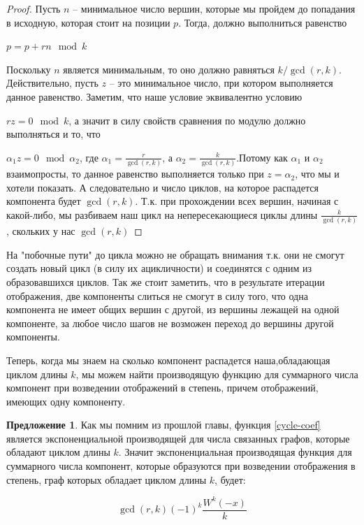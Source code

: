 \documentclass[10pt, a4paper]{report}
\theoremstyle{definition}
\newtheorem{remark}{Предложение}[chapter]
\begin{document}
\begin{proof}
	
	Пусть $n$ -- минимальное число вершин, которые мы пройдем до попадания в исходную, которая стоит на позиции $p$. Тогда, должно выполниться равенство
	
	$p=p+r n\mod k$
	
	Поскольку $n$ является минимальным, то оно должно равняться $k/\gcd(r,k)$. Действительно, пусть $z$ -- это минимальное число, при котором выполняется данное равенство. Заметим, что наше условие эквивалентно условию
	
	$r z = 0\mod k$, а значит в силу свойств сравнения по модулю должно выполняться и то, что 
	
	$\alpha_1 z = 0 \mod \alpha_2$, где $\alpha_1= \frac r {\gcd(r,k)}$, а $\alpha_2= \frac k {\gcd(r,k)}$.Потому как $\alpha_1$ и $\alpha_2$ взаимопросты, то данное равенство выполняется только при $z=\alpha_2$, что мы и хотели показать. А следовательно и число циклов, на которое распадется компонента будет $\gcd(r,k)$. Т.к. при прохождении всех вершин, начиная с какой-либо, мы разбиваем наш цикл на непересекающиеся циклы длины $\frac k {\gcd(r,k)}$, скольких у нас ${\gcd(r,k)}$
\end{proof}	

На "побочные пути" до цикла можно не обращать внимания т.к. они не смогут создать новый цикл (в силу их ацикличности) и соединятся с одним из образовавшихся циклов. Так же стоит заметить, что в результате итерации отображения, две компоненты слиться не смогут в силу того, что одна компонента не имеет общих вершин с другой, из вершины лежащей на одной компоненте, за любое число шагов не возможен переход до вершины другой компоненты.

Теперь, когда мы знаем на сколько компонент распадется наша,обладающая циклом длины $k$, мы можем найти производящую функцию для суммарного числа компонент при возведении отображений в степень, причем отображений, имеющих одну компоненту. 

\begin{remark} Как мы помним из прошлой главы, функция \eqref{cycle-coef} является экспоненциальной производящей для числа связанных графов, которые обладают циклом длины $k$. Значит экспоненциальная производящая функция для суммарного числа компонент, которые образуются при возведении отображения в степень, граф которых обладает циклом длины $k$, будет:

$$\gcd(r,k) (-1)^{k} \frac{W^k(-x)}{k}$$
\end{remark}
\end{document}
